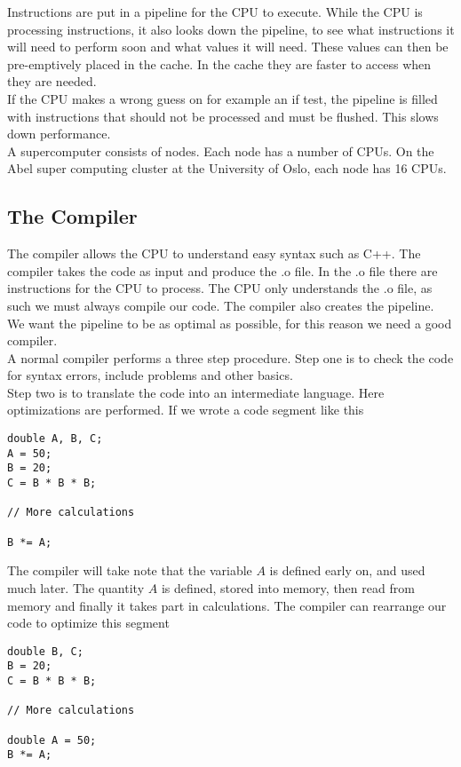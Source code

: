 \documentclass[a4paper,norsk,11pt,twoside]{report}
\begin{document}
Instructions are put in a pipeline for the CPU to execute. While the
CPU is processing instructions, it also looks down the pipeline, to
see what instructions it will need to perform soon and what values it
will need. These values can then be pre-emptively placed in the cache. In
the cache they are faster to access when they are needed. \\

If the CPU makes a wrong guess on for example an if test, the pipeline
is filled with instructions that should not be processed and must be
flushed. This slows down performance. \\

A supercomputer consists of nodes. Each node has a number of CPUs. On
the Abel super computing cluster at the University of Oslo, each node has 16 CPUs.

\subsection{The Compiler}
The compiler allows the CPU to understand easy syntax such as C++. The
compiler takes the code as input and produce the .o file. In the .o
file there are instructions for the CPU to process. The CPU only
understands the .o file, as such we must always compile our code. The
compiler also creates the pipeline. We want the pipeline to be as
optimal as possible, for this reason we need a good compiler. \\

A normal compiler performs a three step procedure. Step one is to
check the code for syntax errors, include problems and other
basics. \\

Step two is to translate the code into an intermediate language. Here
optimizations are performed. If we wrote a code segment like this
\begin{lstlisting}
double A, B, C;
A = 50;
B = 20;
C = B * B * B;

// More calculations

B *= A;
\end{lstlisting}

The compiler will take note that the variable $A$ is defined early on,
and used much later. The quantity $A$ is defined, stored into memory, then read from
memory and finally it takes part in calculations. The compiler can
rearrange our code to optimize this segment
\begin{lstlisting}
double B, C;
B = 20;
C = B * B * B;

// More calculations

double A = 50;
B *= A;
\end{lstlisting}
\end{document}
